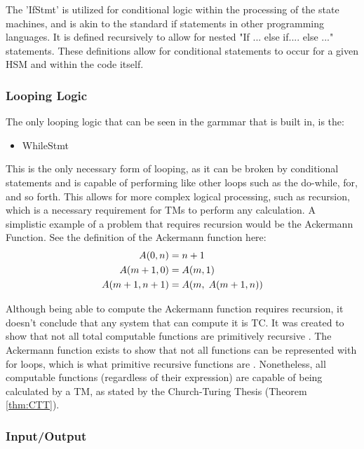 The 'IfStmt' is utilized for conditional logic within the processing of the state machines, and is akin to the standard if statements in other programming languages.
It is defined recursively to allow for nested "If ... else if.... else ..." statements.
These definitions allow for conditional statements to occur for a given HSM and within the code itself.

\subsubsection{Looping Logic}\label{subsubsec:LoopLog}

The only looping logic that can be seen in the garmmar that is built in, is the:
\begin{itemize}
    \item WhileStmt
\end{itemize}

This is the only necessary form of looping, as it can be broken by conditional statements and is capable of performing like other loops such as the do-while, for, and so forth.
This allows for more complex logical processing, such as recursion, which is a necessary requirement for TMs to perform any calculation.
A simplistic example of a problem that requires recursion would be the Ackermann Function.
See the definition of the Ackermann function here:
\[
\begin{aligned}
    A(0, n) &= n + 1\\
    A(m + 1, 0) &= A(m,1)\\
    A(m + 1, n + 1) &= A(m,\hspace{0.1cm} A(m + 1,n))
\end{aligned}
\]

Although being able to compute the Ackermann function requires recursion, it doesn't conclude that any system that can compute it is TC.
It was created to show that not all total computable functions are primitively recursive \cite{AckermannPR}.
The Ackermann function exists to show that not all functions can be represented with for loops, which is what primitive recursive functions are \cite{RecursiveFuncs}.
Nonetheless, all computable functions (regardless of their expression) are capable of being calculated by a TM, as stated by the Church-Turing Thesis (Theorem \ref{thm:CTT}).

\subsubsection{Input/Output}\label{subsubsec:IO}


